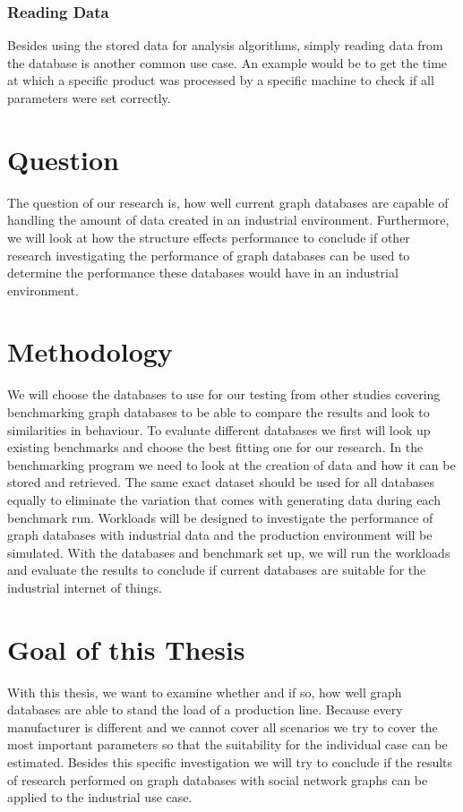 \subsubsection{Reading Data}
Besides using the stored data for analysis algorithms,
simply reading data from the database is another common use case.
An example would be to get the time at which a specific product was processed by a specific machine to check if all parameters were set correctly.

\section{Question}
The question of our research is,
how well current graph databases are capable of handling the amount of data created in an industrial environment.
Furthermore,
we will look at how the structure effects performance to conclude if other research investigating the performance of graph databases can be used to determine the performance these databases would have in an industrial environment.

\section{Methodology}
We will choose the databases to use for our testing from other studies covering benchmarking graph databases to be able to compare the results and look to similarities in behaviour.
To evaluate different databases we first will look up existing benchmarks and choose the best fitting one for our research.
In the benchmarking program we need to look at the creation of data and how it can be stored and retrieved.
The same exact dataset should be used for all databases equally to eliminate the variation that comes with generating data during each benchmark run.
Workloads will be designed to investigate the performance of graph databases with industrial data and the production environment will be simulated.
With the databases and benchmark set up,
we will run the workloads and evaluate the results to conclude if current databases are suitable for the industrial internet of things.

\section{Goal of this Thesis}
With this thesis,
we want to examine whether and if so,
how well graph databases are able to stand the load of a production line.
Because every manufacturer is different and we cannot cover all scenarios we try to cover the most important parameters
so that the suitability for the individual case can be estimated.
Besides this specific investigation we will try to conclude if the results of research performed on graph databases with social network graphs can be applied to the industrial use case.


